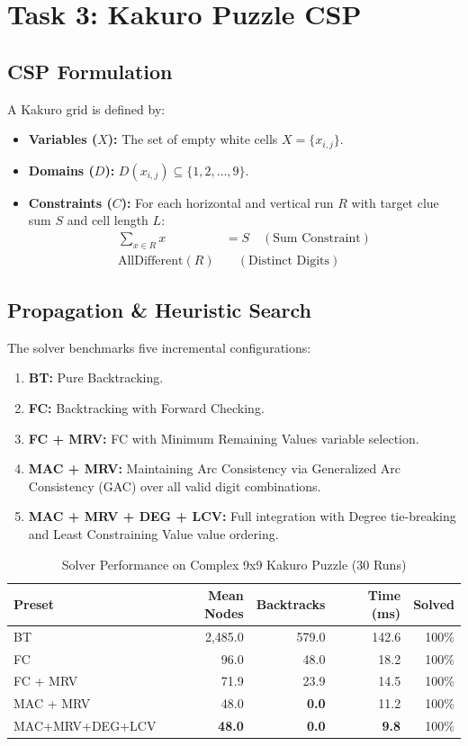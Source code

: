 \documentclass[conference]{IEEEtran}
\begin{document}
\section{Task 3: Kakuro Puzzle CSP}

\subsection{CSP Formulation}
A Kakuro grid is defined by:
\begin{itemize}
    \item \textbf{Variables ($X$):} The set of empty white cells $X = \{x_{i,j}\}$.
    \item \textbf{Domains ($D$):} $D(x_{i,j}) \subseteq \{1, 2, \dots, 9\}$.
    \item \textbf{Constraints ($C$):} For each horizontal and vertical run $R$ with target clue sum $S$ and cell length $L$:
    \begin{align}
        \sum_{x \in R} x &= S \quad (\text{Sum Constraint}) \\
        \text{AllDifferent}(R) &\quad (\text{Distinct Digits})
    \end{align}
\end{itemize}

\subsection{Propagation \& Heuristic Search}
The solver benchmarks five incremental configurations:
\begin{enumerate}
    \item \textbf{BT:} Pure Backtracking.
    \item \textbf{FC:} Backtracking with Forward Checking.
    \item \textbf{FC + MRV:} FC with Minimum Remaining Values variable selection.
    \item \textbf{MAC + MRV:} Maintaining Arc Consistency via Generalized Arc Consistency (GAC) over all valid digit combinations.
    \item \textbf{MAC + MRV + DEG + LCV:} Full integration with Degree tie-breaking and Least Constraining Value value ordering.
\end{enumerate}

\begin{table}[htbp]
\centering
\caption{Solver Performance on Complex 9x9 Kakuro Puzzle (30 Runs)}
\label{tab:kakuro_results}
\begin{tabular}{lrrrr}
\toprule
Preset & Mean Nodes & Backtracks & Time (ms) & Solved \\
\midrule
BT & 2,485.0 & 579.0 & 142.6 & 100\% \\
FC & 96.0 & 48.0 & 18.2 & 100\% \\
FC + MRV & 71.9 & 23.9 & 14.5 & 100\% \\
MAC + MRV & 48.0 & \textbf{0.0} & 11.2 & 100\% \\
MAC+MRV+DEG+LCV & \textbf{48.0} & \textbf{0.0} & \textbf{9.8} & 100\% \\
\bottomrule
\end{tabular}
\end{table}
\end{document}

